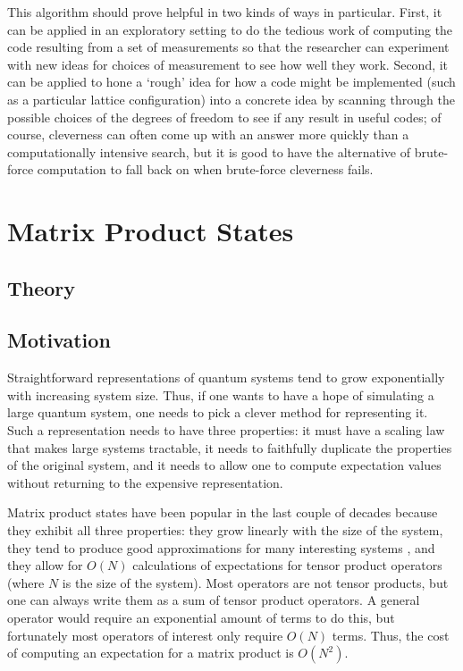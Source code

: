 \documentclass[12pt]{amsbook}
\theoremstyle{plain}
\theoremstyle{definition}
\theoremstyle{remark}
\begin{document}
This algorithm should prove helpful in two kinds of ways in particular.  First, it can be applied in an exploratory setting to do the tedious work of computing the code resulting from a set of measurements so that the researcher can experiment with new ideas for choices of measurement to see how well they work.  Second, it can be applied to hone a `rough' idea for how a code might be implemented (such as a particular lattice configuration) into a concrete idea by scanning through the possible choices of the degrees of freedom to see if any result in useful codes; of course, cleverness can often come up with an answer more quickly than a computationally intensive search, but it is good to have the alternative of brute-force computation to fall back on when brute-force cleverness fails.
\part{Matrix Product States}
\chapter{Theory}
\chapter{Motivation}

Straightforward representations of quantum systems tend to grow exponentially with increasing system size.  Thus, if one wants to have a hope of simulating a large quantum system, one needs to pick a clever method for representing it.  Such a representation needs to have three properties:  it must have a scaling law that makes large systems tractable, it needs to faithfully duplicate the properties of the original system, and it needs to allow one to compute expectation values without returning to the expensive representation.

Matrix product states \cite{Rommer:1997gf} \cite{Perotti:2005bh} \cite{cond-mat/0404706} \cite{cond-mat/0505140} \cite{Schollwock:2005ul} have been popular in the last couple of decades because they exhibit all three properties:  they grow linearly with the size of the system, they tend to produce good approximations for many interesting systems \cite{cond-mat/0505140}, and they allow for $O(N)$ calculations of expectations for tensor product operators (where $N$ is the size of the system).  Most operators are not tensor products, but one can always write them as a sum of tensor product operators.  A general operator would require an exponential amount of terms to do this, but fortunately most operators of interest only require $O(N)$ terms.  Thus, the cost of computing an expectation for a matrix product is $O(N^2)$.
\end{document}
